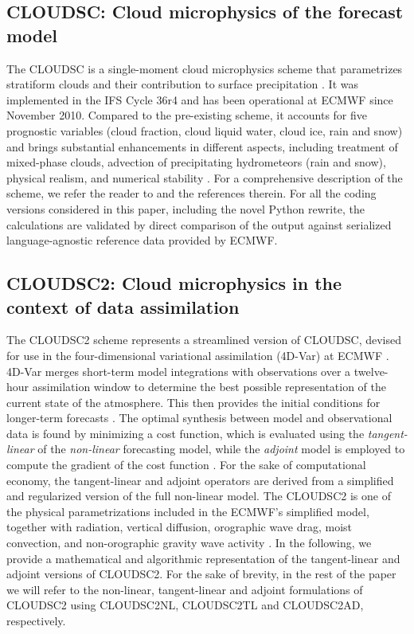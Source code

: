 \documentclass[gmd,manuscript,online]{copernicus}
\theoremstyle{theorem}
\theoremstyle{definition}
\theoremstyle{remark}
\theoremstyle{proposition}
\begin{document}
	\subsection{CLOUDSC: Cloud microphysics of the forecast model}

	The CLOUDSC is a single-moment cloud microphysics scheme that parametrizes stratiform clouds and their contribution to surface precipitation \citep{ifs48r1}. It was implemented in the IFS Cycle 36r4 and has been operational at ECMWF since November 2010. Compared to the pre-existing scheme, it accounts for five prognostic variables (cloud fraction, cloud liquid water, cloud ice, rain and snow) and brings substantial enhancements in different aspects, including treatment of mixed-phase clouds, advection of precipitating hydrometeors (rain and snow), physical realism, and numerical stability \citep{nogherotto16}. For a comprehensive description of the scheme, we refer the reader to \citet{forbes11b} and the references therein. For all the coding versions considered in this paper, including the novel Python rewrite, the calculations are validated by direct comparison of the output against serialized language-agnostic reference data provided by ECMWF.

	\subsection{CLOUDSC2: Cloud microphysics in the context of data assimilation}

	The CLOUDSC2 scheme represents a streamlined version of CLOUDSC, devised for use in the four-dimensional variational assimilation (4D-Var) at ECMWF \citep{courtier94}. 4D-Var merges short-term model integrations with observations over a twelve-hour assimilation window to determine the best possible representation of the current state of the atmosphere. This then provides the initial conditions for longer-term forecasts \citep{janiskova23}. The optimal synthesis between model and observational data is found by minimizing a cost function, which is evaluated using the \emph{tangent-linear} of the \emph{non-linear} forecasting model, while the \emph{adjoint} model is employed to compute the gradient of the cost function \citep{errico97, janiskova99}. For the sake of computational economy, the tangent-linear and adjoint operators are derived from a simplified and regularized version of the full non-linear model. The CLOUDSC2 is one of the physical parametrizations included in the ECMWF's simplified model, together with radiation, vertical diffusion, orographic wave drag, moist convection, and non-orographic gravity wave activity \citep{janiskova23}. In the following, we provide a mathematical and algorithmic representation of the tangent-linear and adjoint versions of CLOUDSC2. For the sake of brevity, in the rest of the paper we will refer to the non-linear, tangent-linear and adjoint formulations of CLOUDSC2 using CLOUDSC2NL, CLOUDSC2TL and CLOUDSC2AD, respectively.
\end{document}
